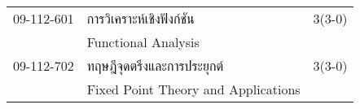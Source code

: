 \begin{longtable}{p{}p{}r{}}
09-112-601 & การวิเคราะห์เชิงฟังก์ชัน & 3(3-0)\\
& Functional Analysis & \\[3mm]
09-112-702 & ทฤษฎีจุดตรึงและการประยุกต์ & 3(3-0)\\
& Fixed Point Theory and Applications & \\[3mm]
\end{longtable}
